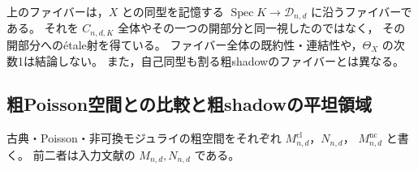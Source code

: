\begin{remark}[ファイバーの範囲]
上のファイバーは，$X$ との同型を記憶する
$\operatorname{Spec}K\to\mathcal D_{n,d}$ に沿うファイバーである。
それを $C_{n,d,K}$ 全体やその一つの開部分と同一視したのではなく，
その開部分への\'{e}tale射を得ている。
ファイバー全体の既約性・連結性や，$\Theta_X$ の次数1は結論しない。
また，自己同型も割る粗shadowのファイバーとは異なる。
\end{remark}

\subsection{粗Poisson空間との比較と粗shadowの平坦領域}

古典・Poisson・非可換モジュライの粗空間をそれぞれ
$M^{\mathrm{cl}}_{n,d}$，$N_{n,d}$，
$M^{\mathrm{nc}}_{n,d}$ と書く。
前二者は入力文献\cite[定理9.2]{PoissonDP}の $M_{n,d},N_{n,d}$ である。

